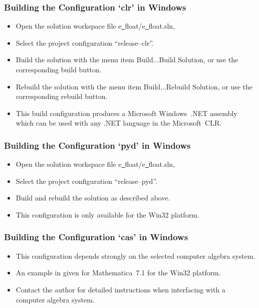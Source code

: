 \subsubsection{Building the Configuration `clr' in Windows{\footnotesize {\textregistered}}}

\begin{itemize}
\item Open the solution workspace file
{\courier e\underline\ float/e\underline\ float.sln},
\item Select the project configuration ``release--clr''.
\item Build the solution with the menu item {\courier Build}$\dots${\courier Build Solution},
or use the corresponding build button.
\item Rebuild the solution with the menu item {\courier Build}$\dots${\courier Rebuild Solution},
or use the corresponding rebuild button.
\item This build configuration produces a
Microsoft{\footnotesize {\textregistered}} Windows{\footnotesize {\textregistered}}~.NET
assembly which can be used with any .NET language in the
Microsoft{\footnotesize {\textregistered}}~CLR.
\end{itemize}

\subsubsection{Building the Configuration `pyd' in Windows{\footnotesize {\textregistered}}}

\begin{itemize}
\item Open the solution workspace file
{\courier e\underline\ float/e\underline\ float.sln},
\item Select the project configuration ``release--pyd''.
\item Build and rebuild the solution as described above.
\item This configuration is only available for the Win32 platform.
\end{itemize}

\subsubsection{Building the Configuration `cas' in Windows{\footnotesize {\textregistered}}}

\begin{itemize}
\item This configuration depends strongly on the selected computer algebra system.
\item An example in given for Mathematica{\footnotesize {\textregistered}}~7.1
for the Win32 platform.
\item Contact the author for detailed instructions when interfacing with
a computer algebra system.
\end{itemize}

